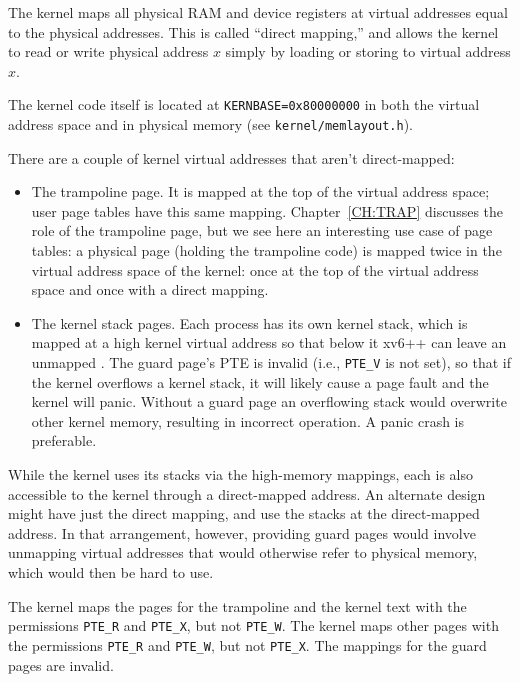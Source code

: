 The kernel maps all physical RAM and device registers at virtual
addresses equal to the physical addresses. This is called ``direct
mapping,'' and allows the kernel to read or write physical address $x$
simply by loading or storing to virtual address $x$.

The kernel code itself is located at \lstinline{KERNBASE=0x80000000} in
both the virtual address space and in physical memory (see
\texttt{kernel/memlayout.h}).

There are a couple of kernel virtual addresses that aren't direct-mapped:

\begin{itemize}

\item The trampoline page. It is mapped at the top of the virtual address
  space; user page tables have this same mapping. Chapter~\ref{CH:TRAP}
  discusses the role of the trampoline page, but we see here an
  interesting use case of page tables: a physical page (holding the
  trampoline code) is mapped twice in the virtual address space of the
  kernel: once at the top of the virtual address space and once with a
  direct mapping.

\item The kernel stack pages. Each process has its own kernel stack,
  which is mapped at a high kernel virtual address so that below it xv6++
  can leave an unmapped . The guard page's PTE is
  invalid (i.e., \lstinline{PTE_V} is not set), so that if the kernel
  overflows a kernel stack, it will likely cause a page fault and the
  kernel will panic. Without a guard page an overflowing stack would
  overwrite other kernel memory, resulting in incorrect operation. A
  panic crash is preferable.

\end{itemize}

While the kernel uses its stacks via the high-memory mappings, each is
also accessible to the kernel through a direct-mapped address. An
alternate design might have just the direct mapping, and use the stacks
at the direct-mapped address. In that arrangement, however, providing
guard pages would involve unmapping virtual addresses that would
otherwise refer to physical memory, which would then be hard to use.

The kernel maps the pages for the trampoline and the kernel text with the
permissions \lstinline{PTE_R} and \lstinline{PTE_X}, but not
\lstinline{PTE_W}. The kernel maps other pages with the permissions
\lstinline{PTE_R} and \lstinline{PTE_W}, but not \lstinline{PTE_X}. The
mappings for the guard pages are invalid.

